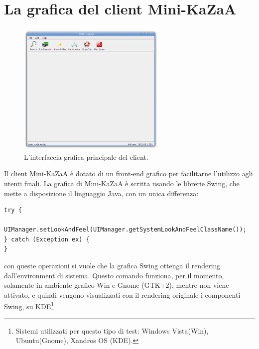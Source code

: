 \section{La grafica del client Mini-KaZaA}\label{sec:grafica}
\begin{figure}[t]
 \centering
 \includegraphics[width=270px,height=245px,bb=14 14 841 737]{images/mini_kazaa_client.eps}
 \caption{L'interfaccia grafica principale del client.}
 \label{fig:mini_kazaa_client}
\end{figure}
Il client Mini-KaZaA è dotato di un front-end grafico per facilitarne l'utilizzo agli utenti finali. La grafica di Mini-KaZaA è scritta usando le librerie Swing, che mette a disposizione il linguaggio Java, con un unica differenza:
\begin{lstlisting}
try {
	UIManager.setLookAndFeel(UIManager.getSystemLookAndFeelClassName());
} catch (Exception ex) {
}
\end{lstlisting}
con queste operazioni si vuole che la grafica Swing ottenga il rendering dall'environment di sistema. Questo comando funziona, per il momento, solamente in ambiente grafico Win e Gnome (GTK+2), mentre non viene attivato, e quindi vengono visualizzati con il rendering originale i componenti Swing, su KDE\footnote{Sistemi utilizzati per questo tipo di test: Windows Vista(Win), Ubuntu(Gnome), Xandros OS (KDE).}

